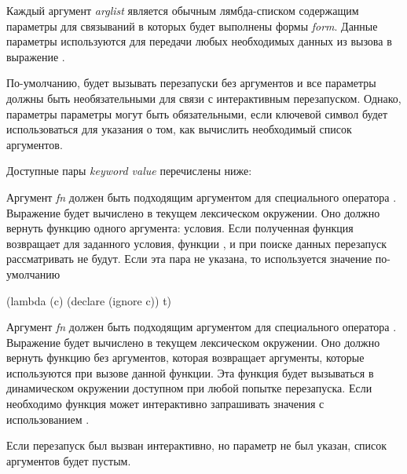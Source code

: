 \begin{defmac}
Каждый аргумент \emph{arglist} является обычным лямбда-списком содержащим
параметры для связываний в которых будет выполнены формы \emph{form}. Данные
параметры используются для передачи любых необходимых данных из вызова
 в выражение .

По-умолчанию,  будет вызывать перезапуски без
аргументов и все параметры должны быть необязательными для связи с интерактивным
перезапуском. Однако, параметры параметры могут быть обязательными, если
ключевой символ  будет использоваться для указания
 о том, как вычислить необходимый список
аргументов.

Доступные пары \emph{keyword value} перечислены ниже:
\begin{flushdesc}

\item[\cd{:test \emph{fn}}]

  Аргумент \emph{fn} должен быть подходящим аргументом для специального
  оператора .
  Выражение  будет вычислено в текущем лексическом
  окружении. Оно должно вернуть функцию одного аргумента: условия. Если
  полученная функция возвращает  для заданного условия, функции
  ,  и  при поиске
  данных перезапуск рассматривать не будут. Если эта пара не указана, то
  используется значение по-умолчанию
  \begin{lisp}
    (lambda (c) (declare (ignore c)) t)
  \end{lisp}

\item[\cd{:interactive \emph{fn}}]

  Аргумент \emph{fn} должен быть подходящим аргументом для специального
  оператора .
  Выражение  будет вычислено в текущем лексическом
  окружении. Оно должно вернуть функцию без аргументов, которая возвращает
  аргументы, которые используются  при вызове
  данной функции. Эта функция будет вызываться в динамическом окружении
  доступном при любой попытке перезапуска.
  Если необходимо функция может интерактивно запрашивать значения с
  использованием .

  Если перезапуск был вызван интерактивно, но параметр  не был
  указан, список аргументов будет пустым.

\item[\cd{:report \emph{exp}}]


\end{flushdesc}
\end{defmac}

